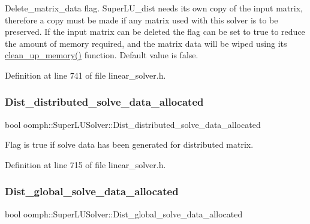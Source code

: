 Delete\+\_\+matrix\+\_\+data flag. Super\+L\+U\+\_\+dist needs its own copy of the input matrix, therefore a copy must be made if any matrix used with this solver is to be preserved. If the input matrix can be deleted the flag can be set to true to reduce the amount of memory required, and the matrix data will be wiped using its \hyperlink{classoomph_1_1SuperLUSolver_aec78b96a8f831a89f9b8fb48b1ce0c68}{clean\+\_\+up\+\_\+memory()} function. Default value is false. 



Definition at line 741 of file linear\+\_\+solver.\+h.

\mbox{\label{classoomph_1_1SuperLUSolver_ae1058d90e75f3cc6229581382f159324}} 
\subsubsection{\texorpdfstring{Dist\+\_\+distributed\+\_\+solve\+\_\+data\+\_\+allocated}{Dist\_distributed\_solve\_data\_allocated}}
{\footnotesize\ttfamily bool oomph\+::\+Super\+L\+U\+Solver\+::\+Dist\+\_\+distributed\+\_\+solve\+\_\+data\+\_\+allocated\hspace{0.3cm}{\ttfamily [private]}}



Flag is true if solve data has been generated for distributed matrix. 



Definition at line 715 of file linear\+\_\+solver.\+h.

\mbox{\label{classoomph_1_1SuperLUSolver_ac5458172732cfe687891af65cc2d45e6}} 
\subsubsection{\texorpdfstring{Dist\+\_\+global\+\_\+solve\+\_\+data\+\_\+allocated}{Dist\_global\_solve\_data\_allocated}}
{\footnotesize\ttfamily bool oomph\+::\+Super\+L\+U\+Solver\+::\+Dist\+\_\+global\+\_\+solve\+\_\+data\+\_\+allocated\hspace{0.3cm}{\ttfamily [private]}}



